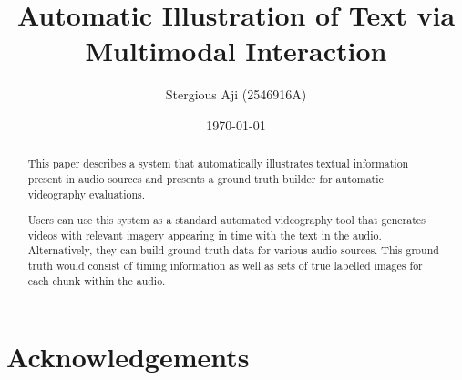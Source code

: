 \documentclass{l4proj}
\begin{document}
\title{Automatic Illustration of Text via Multimodal Interaction}
\author{Stergious Aji (2546916A)}
\date{\today}

\maketitle

\begin{abstract}
    This paper describes a system that automatically illustrates textual information present in audio sources and presents a ground truth builder for automatic videography evaluations.
    
    Users can use this system as a standard automated videography tool that generates videos with relevant imagery appearing in time with the text in the audio. Alternatively, they can build ground truth data for various audio sources. This ground truth would consist of timing information as well as sets of true labelled images for each chunk within the audio.

    
    
\end{abstract}

\chapter*{Acknowledgements}
%

%
\end{document}
